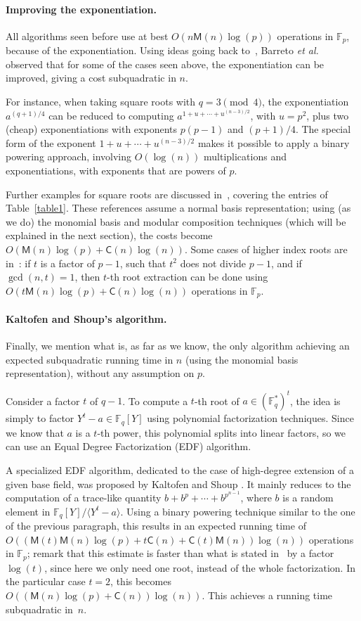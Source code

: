 \documentclass[12pt]{article}
\theoremstyle{plain}
\theoremstyle{definition}
\def\F{\mathbb{F}}
\def\M{\mathsf{M}}
\def\CC{\mathsf{C}}
\newcounter{algorithm}
\begin{document}
\paragraph{Improving the exponentiation.}
All algorithms seen before use at best $O(n\M(n)\log(p))$ operations
in $\F_p$, because of the exponentiation. Using ideas going back
to~\cite{ItTs88}, Barreto {\it et al.}~\cite{BaKiLySc02} observed that
for some of the cases seen above, the exponentiation can be improved,
giving a cost subquadratic in $n$.

For instance, when taking square roots with $q = 3 \pmod 4$, the
exponentiation $a^{(q+1)/4}$ can be reduced to computing
$a^{1+u+\cdots+u^{(n-3)/2}}$, with $u=p^2$, plus two (cheap)
exponentiations with exponents $p(p-1)$ and $(p+1)/4$. The special
form of the exponent $1+u+\cdots+u^{(n-3)/2}$ makes it possible to
apply a binary powering approach, involving $O(\log(n))$
multiplications and exponentiations, with exponents that are powers of
$p$.

Further examples for square roots are discussed
in~\cite{KoCaYuLi06,HaChKi09}, covering the entries of
Table~\ref{table1}. These references assume a normal basis
representation; using (as we do) the monomial basis and modular
composition techniques (which will be explained in the next section),
the costs become $O(\M(n)\log(p)+\CC(n)\log(n))$. Some cases of higher
index roots are in~\cite{BaVo06}: if $t$ is a factor of $p-1$, such
that $t^2$ does not divide $p-1$, and if $\gcd(n,t)=1$, then $t$-th
root extraction can be done using $O(t\M(n)\log(p)+\CC(n)\log(n))$
operations in $\F_p$.

\paragraph{Kaltofen and Shoup's algorithm.}
Finally, we mention what is, as far as we know, the only algorithm
achieving an expected subquadratic running time in $n$ (using the
monomial basis representation), without any assumption on $p$.

Consider a factor $t$ of $q-1$. To compute a $t$-th root of
$a\in(\F_q^*)^t$, the idea is simply to factor $Y^t - a \in \F_q[Y]$
using polynomial factorization techniques. Since we know that $a$ is a
$t$-th power, this polynomial splits into linear factors, so we
can use an Equal Degree Factorization (EDF) algorithm.

A specialized EDF algorithm, dedicated to the case of high-degree
extension of a given base field, was proposed by Kaltofen and Shoup
\cite{KaltofenShoup1997}. It mainly reduces to the computation of a
trace-like quantity $b+b^p + \cdots + b^{p^{n-1}}$, where $b$ is a
random element in $\F_q[Y]/\langle Y^t-a\rangle$. Using a binary
powering technique similar to the one of the previous paragraph, this
results in an expected running time of $O((\M(t)\M(n)\log(p) + t
\CC(n) + \CC(t)\M(n))\log(n))$ operations in $\F_p$; remark that this
estimate is faster than what is stated in~\cite{KaltofenShoup1997} by
a factor $\log(t)$, since here we only need one root, instead of the
whole factorization. In the particular case $t=2$, this becomes
$O((\M(n)\log(p) + \CC(n))\log(n))$. This achieves a running time
subquadratic in~$n$.
\end{document}
